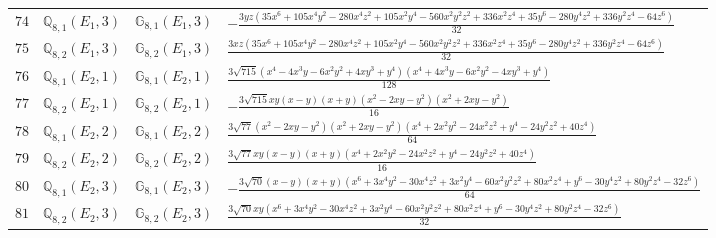 \documentclass[fleqn,8pt,landscape]{jsarticle}
\begin{document}
\begin{table}[ht!]
\begin{center}
\begin{tabular}{cccl}
$ 74 $ & $ \mathbb{Q}_{8,1}(E_{1},3) $ & $ \mathbb{G}_{8,1}(E_{1},3) $ & $ - \frac{3 y z \left(35 x^{6} + 105 x^{4} y^{2} - 280 x^{4} z^{2} + 105 x^{2} y^{4} - 560 x^{2} y^{2} z^{2} + 336 x^{2} z^{4} + 35 y^{6} - 280 y^{4} z^{2} + 336 y^{2} z^{4} - 64 z^{6}\right)}{32} $ \\
$ 75 $ & $ \mathbb{Q}_{8,2}(E_{1},3) $ & $ \mathbb{G}_{8,2}(E_{1},3) $ & $ \frac{3 x z \left(35 x^{6} + 105 x^{4} y^{2} - 280 x^{4} z^{2} + 105 x^{2} y^{4} - 560 x^{2} y^{2} z^{2} + 336 x^{2} z^{4} + 35 y^{6} - 280 y^{4} z^{2} + 336 y^{2} z^{4} - 64 z^{6}\right)}{32} $ \\
$ 76 $ & $ \mathbb{Q}_{8,1}(E_{2},1) $ & $ \mathbb{G}_{8,1}(E_{2},1) $ & $ \frac{3 \sqrt{715} \left(x^{4} - 4 x^{3} y - 6 x^{2} y^{2} + 4 x y^{3} + y^{4}\right) \left(x^{4} + 4 x^{3} y - 6 x^{2} y^{2} - 4 x y^{3} + y^{4}\right)}{128} $ \\
$ 77 $ & $ \mathbb{Q}_{8,2}(E_{2},1) $ & $ \mathbb{G}_{8,2}(E_{2},1) $ & $ - \frac{3 \sqrt{715} x y \left(x - y\right) \left(x + y\right) \left(x^{2} - 2 x y - y^{2}\right) \left(x^{2} + 2 x y - y^{2}\right)}{16} $ \\
$ 78 $ & $ \mathbb{Q}_{8,1}(E_{2},2) $ & $ \mathbb{G}_{8,1}(E_{2},2) $ & $ \frac{3 \sqrt{77} \left(x^{2} - 2 x y - y^{2}\right) \left(x^{2} + 2 x y - y^{2}\right) \left(x^{4} + 2 x^{2} y^{2} - 24 x^{2} z^{2} + y^{4} - 24 y^{2} z^{2} + 40 z^{4}\right)}{64} $ \\
$ 79 $ & $ \mathbb{Q}_{8,2}(E_{2},2) $ & $ \mathbb{G}_{8,2}(E_{2},2) $ & $ \frac{3 \sqrt{77} x y \left(x - y\right) \left(x + y\right) \left(x^{4} + 2 x^{2} y^{2} - 24 x^{2} z^{2} + y^{4} - 24 y^{2} z^{2} + 40 z^{4}\right)}{16} $ \\
$ 80 $ & $ \mathbb{Q}_{8,1}(E_{2},3) $ & $ \mathbb{G}_{8,1}(E_{2},3) $ & $ - \frac{3 \sqrt{70} \left(x - y\right) \left(x + y\right) \left(x^{6} + 3 x^{4} y^{2} - 30 x^{4} z^{2} + 3 x^{2} y^{4} - 60 x^{2} y^{2} z^{2} + 80 x^{2} z^{4} + y^{6} - 30 y^{4} z^{2} + 80 y^{2} z^{4} - 32 z^{6}\right)}{64} $ \\
$ 81 $ & $ \mathbb{Q}_{8,2}(E_{2},3) $ & $ \mathbb{G}_{8,2}(E_{2},3) $ & $ \frac{3 \sqrt{70} x y \left(x^{6} + 3 x^{4} y^{2} - 30 x^{4} z^{2} + 3 x^{2} y^{4} - 60 x^{2} y^{2} z^{2} + 80 x^{2} z^{4} + y^{6} - 30 y^{4} z^{2} + 80 y^{2} z^{4} - 32 z^{6}\right)}{32} $ \\
 \hline \hline
\end{tabular}
\end{center}
\end{table}
\end{document}
